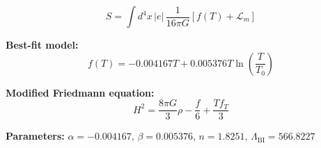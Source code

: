 
\begin{equation}
  S = \int d^4x \, |e| \, \frac{1}{16\pi G} \left[ f(T) + \mathcal{L}_m \right]
\end{equation}

\textbf{Best-fit model:}
\begin{equation}
  f(T) = -0.004167 T + 0.005376 T \ln\!\left(\frac{T}{T_0}\right)
\end{equation}

\textbf{Modified Friedmann equation:}
\begin{equation}
  H^2 = \frac{8\pi G}{3} \rho - \frac{f}{6} + \frac{T f_T}{3}
\end{equation}

\textbf{Parameters:}
$\alpha = -0.004167$, \quad
$\beta = 0.005376$, \quad
$n = 1.8251$, \quad
$\Lambda_{\text{BI}} = 566.8227$